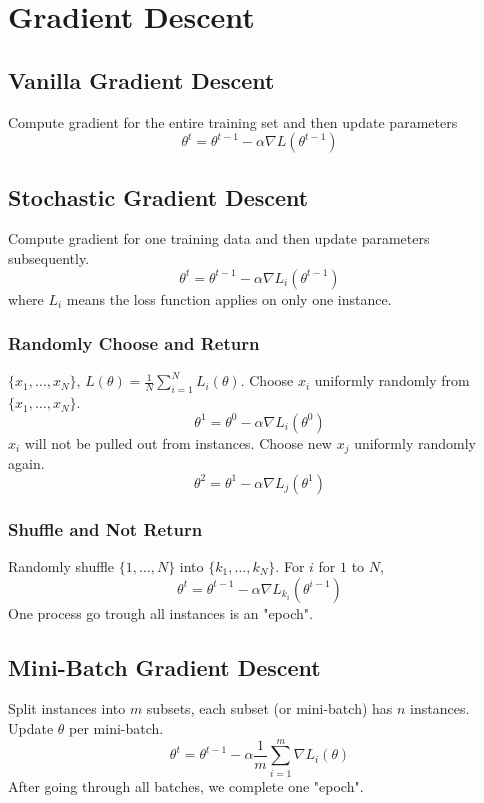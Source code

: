 \documentclass{article}
\begin{document}
    \section{Gradient Descent}
        \subsection{Vanilla Gradient Descent}
            Compute gradient for the entire training set and then update parameters
            \[
                \theta^t = \theta^{t-1} - \alpha \nabla L(\theta^{t-1})
            \]
        \subsection{Stochastic Gradient Descent}
            Compute gradient for one training data and then update parameters subsequently.
            \[
                \theta^t = \theta^{t-1} - \alpha\nabla L_i(\theta^{t-1})
            \]
            where $L_i$ means the loss function applies on only one instance.
            \subsubsection{Randomly Choose and Return}
                $\{x_1,\dots,x_N\}$, $L(\theta)=\frac{1}{N}\sum_{i=1}^N L_i(\theta)$. Choose $x_i$ uniformly randomly from $\{x_1,\dots,x_N\}$.
                \[
                    \theta^1 = \theta^{0}-\alpha\nabla L_i(\theta^0)
                \]
                $x_i$ will not be pulled out from instances. Choose new $x_j$ uniformly randomly again.
                \[
                    \theta^2 = \theta^1-\alpha\nabla L_j(\theta^1)
                \]
            \subsubsection{Shuffle and Not Return}
                Randomly shuffle $\{1,\dots,N\}$ into $\{k_1,\dots,k_N\}$. For $i$ for $1$ to $N$,
                \[
                    \theta^t = \theta^{t-1}-\alpha\nabla L_{k_i}(\theta^{i-1})
                \]
                One process go trough all instances is an "epoch".
        \subsection{Mini-Batch Gradient Descent}
            Split instances into $m$ subsets, each subset (or mini-batch) has $n$ instances. Update $\theta$ per mini-batch.
            \[
                \theta^t = \theta^{t-1}-\alpha \frac{1}{m}\sum_{i=1}^m\nabla L_{i}(\theta)
            \]
            After going through all batches, we complete one "epoch".
\end{document}
